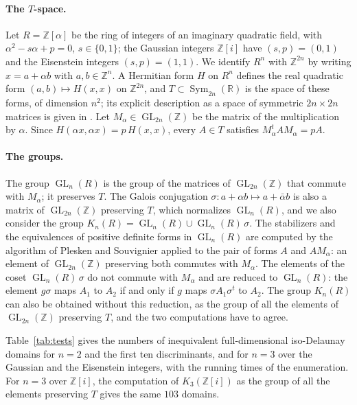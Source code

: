 \documentclass{amsart}
\newcommand{\Sym}{\operatorname{Sym}}
\newcommand{\GL}{\operatorname{GL}}
\newcommand{\ZZ}{\mathbb{Z}}
\newcommand{\RR}{\mathbb{R}}
\begin{document}
\paragraph{The \(T\)-space.}
Let \(R=\ZZ[\alpha]\) be the ring of integers of an imaginary quadratic field,
with \(\alpha^2-s\alpha+p=0\), \(s\in\{0,1\}\); the Gaussian integers
\(\ZZ[i]\) have \((s,p)=(0,1)\) and the Eisenstein integers \((s,p)=(1,1)\).
We identify \(R^n\) with \(\ZZ^{2n}\) by writing \(x=a+\alpha b\) with
\(a,b\in\ZZ^n\).  A Hermitian form \(H\) on \(R^n\) defines the real quadratic
form \((a,b)\mapsto H(x,x)\) on \(\ZZ^{2n}\), and \(T\subset\Sym_{2n}(\RR)\)
is the space of these forms, of dimension \(n^2\); its explicit description
as a space of symmetric \(2n\times 2n\) matrices is given in
\cite[Section~6.1]{DutourSikiricGanglGunnellsHankeSchurmannYasaki2016}.  Let
\(M_\alpha\in\GL_{2n}(\ZZ)\) be the matrix of the multiplication by
\(\alpha\).  Since \(H(\alpha x,\alpha x)=p\,H(x,x)\), every \(A\in T\)
satisfies \(M_\alpha^tAM_\alpha=pA\).

\paragraph{The groups.}
The group \(\GL_n(R)\) is the group of the matrices of \(\GL_{2n}(\ZZ)\) that
commute with \(M_\alpha\); it preserves \(T\).  The Galois conjugation
\(\sigma\colon a+\alpha b\mapsto a+\bar\alpha b\) is also a matrix of
\(\GL_{2n}(\ZZ)\) preserving \(T\), which normalizes \(\GL_n(R)\), and we also
consider the group
\(K_n(R)=\GL_n(R)\cup\GL_n(R)\,\sigma\).  The stabilizers and the equivalences
of positive definite forms in \(\GL_n(R)\) are computed by the algorithm of
Plesken and Souvignier \cite{PleskenSouvignier1997} applied to the pair of
forms \(A\) and \(AM_\alpha\): an element of \(\GL_{2n}(\ZZ)\) preserving both
commutes with \(M_\alpha\).  The elements of the coset \(\GL_n(R)\,\sigma\) do
not commute with \(M_\alpha\) and are reduced to
\(\GL_n(R)\): the element \(g\sigma\) maps \(A_1\) to \(A_2\) if and only if
\(g\) maps \(\sigma A_1\sigma^t\) to \(A_2\).  The group \(K_n(R)\) can also be
obtained without this reduction, as the group of all the elements of
\(\GL_{2n}(\ZZ)\) preserving \(T\), and the two computations have to agree.

Table~\ref{tab:tests} gives the numbers of inequivalent full-dimensional
iso-Delaunay domains for \(n=2\) and the first ten discriminants, and for
\(n=3\) over the Gaussian and the Eisenstein integers, with the running
times of the enumeration.  For \(n=3\) over \(\ZZ[i]\), the
computation of \(K_3(\ZZ[i])\) as the group of all the elements preserving
\(T\) gives the same \(103\) domains.
\end{document}
